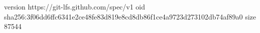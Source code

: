 version https://git-lfs.github.com/spec/v1
oid sha256:3f06dd6ffc6341e2ce48fe83d819e8cd8db86f1ce4a9723d273102db74af89a0
size 87544
